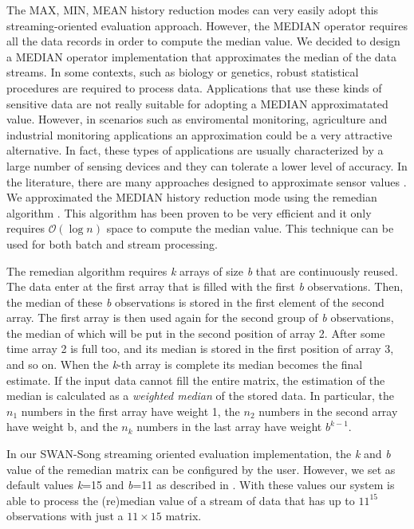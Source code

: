 The MAX, MIN, MEAN history reduction modes can very easily adopt this streaming-oriented evaluation approach. However, the MEDIAN operator requires all the data records in order to compute the median value. We decided to design a MEDIAN operator implementation that approximates the median of the data streams. In some contexts, such as biology or genetics, robust statistical procedures are required to process data. Applications that use these kinds of sensitive data are not really suitable for adopting a MEDIAN approximatated value. However, in scenarios such as enviromental monitoring, agriculture and industrial monitoring applications \cite{approximationtimeseries} an approximation could be a very attractive alternative. In fact, these types of applications are usually characterized by a large number of sensing devices and they can tolerate a lower level of accuracy. In the literature, there are many approaches designed to approximate sensor values \cite{approximateprobabilistic, approximationdatabase}. 
We approximated the MEDIAN history reduction mode using the remedian algorithm \cite{remedian}. This algorithm has been proven to be very efficient \cite{remedianfurtheranalysis} and it only requires $\mathcal{O}(\log{}n)$ space to compute the median value. This technique can be used for both batch and stream processing. 

The remedian algorithm requires \emph{k} arrays of size \emph{b} that are continuously reused. The data enter at the first array that is filled with the first \emph{b} observations. Then, the median of these \emph{b} observations is stored in the first element of the second array. The first array is then used again for the second group of \emph{b} observations, the median of which will be put in the second position of array 2. After some time array 2 is full too, and its median is stored in the first position of array 3, and so on. When the \emph{k}-th array is complete its median becomes the final estimate. If the input data cannot fill the entire matrix, the estimation of the median is calculated as a \emph{weighted median} of the stored data. In particular, the $n_1$ numbers in the first array have weight 1, the $n_2$ numbers in the second array have weight b, and the \emph{$n_k$} numbers in the last array have weight $b^{k-1}$.

In our SWAN-Song streaming oriented evaluation implementation, the \emph{k} and \emph{b} value of the remedian matrix can be configured by the user. However, we set as default values \emph{k}=15 and \emph{b}=11 as described in \cite{remedian}. With these values our system is able to process the (re)median value of a stream of data that has up to $11^{15}$ observations with just a $11 \times 15$ matrix. 

